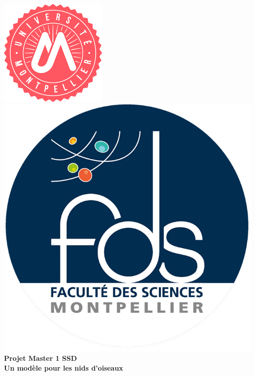 \documentclass[frenchb]{report}
\newcommand{\1}{\mathbbm{1}}
\theoremstyle{definition}\newtheorem{defn}{Définition}
\theoremstyle{definition}\newtheorem{exm}{Exemple}
\theoremstyle{definition}\newtheorem{nota}{Notation}
\theoremstyle{definition}\newtheorem{rem}{Remarque}
\begin{document}
\def\appendixpage{\vspace*{8cm}
\begin{center}
\Huge\textbf{Annexes}
\end{center}
}
\def\appendixname{Annexe}%

\begin{titlepage}
\begin{center}
\includegraphics[scale=0.6]{logo.png}
\hfill
\includegraphics[scale=0.35]{fds_logo.png}\\[3cm]
\linespread{1.2}\huge {\bfseries Projet Master 1 SSD }\\[0.5cm]
\linespread{1.2}\LARGE {\bfseries Un modèle pour les nids d'oiseaux}\\[1.5cm]
\linespread{1}


\end{center}
\end{titlepage}
\end{document}
